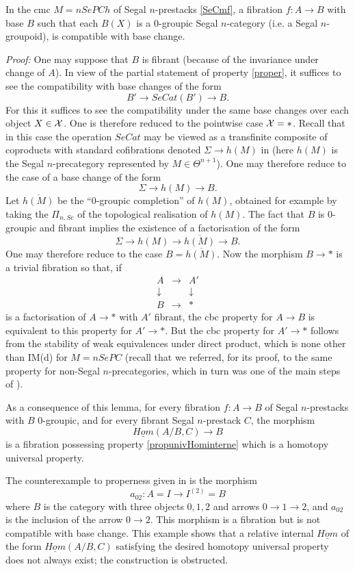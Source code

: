 \begin{lemma}
\label{cestccb}
In the cmc $M=nSePCh$ of Segal $n$-prestacks \ref{SeCmf}, a
fibration
$f:A\rightarrow B$ with base $B$ such that each $B(X)$ is a
$0$-groupic Segal $n$-category (i.e. a Segal $n$-groupoid), is compatible with
base change.
\end{lemma}
{\em Proof:}
One may suppose that $B$ is fibrant (because of the invariance under
change
of $A$).  In view of the partial statement of property \ref{proper},
it suffices
to see the compatibility with base changes of the form
$$
B'\rightarrow SeCat(B')\rightarrow B.
$$
For this it suffices to see the compatibility under the same
base
changes over each object $X\in {\cal X}$. One is therefore reduced to the pointwise
case
${\cal X} =\ast$. Recall that in this case the operation $SeCat$ may be viewed
as a transfinite composite of coproducts with standard cofibrations
denoted $\Sigma \rightarrow h(M)$ in \cite{nCAT} (here $h(M)$ is the
Segal $n$-precategory represented by $M\in \Theta^{n+1}$). One may therefore
reduce
to the case of a base change of the form
$$
\Sigma \rightarrow h(M) \rightarrow B.
$$
Let $\overline{h(M)}$ be the ``$0$-groupic completion'' of $h(M)$,
obtained for
example by taking the $\Pi _{n,Se}$ of the topological realisation
of $h(M)$.
The fact that $B$ is $0$-groupic and fibrant implies the existence of a
factorisation of the form
$$
\Sigma \rightarrow h(M) \rightarrow \overline{h(M)} \rightarrow B.
$$
One may therefore reduce to the case $B= \overline{h(M)}$. Now the
morphism
$B\rightarrow \ast$ is a trivial fibration so that, if
$$
\begin{array}{ccc}
A&\rightarrow &A'\\
\downarrow &&\downarrow \\
B&\rightarrow &\ast
\end{array}
$$
is a factorisation of $A\rightarrow \ast$ with $A'$ fibrant,
the cbc
property for $A\rightarrow B$ is equivalent to this property for
$A'\rightarrow \ast$. But the cbc property for $A'\rightarrow \ast$
follows
from the stability of weak equivalences under direct
product, which is none other than IM(d) for $M=nSePC$ (recall that we referred,
for its proof, to the same property for
non-Segal $n$-precategories, which in turn was one of the
main steps of \cite{nCAT}).
\eop

As a consequence of this lemma, for every fibration $f:A\rightarrow B$
of Segal $n$-prestacks with $B$ $0$-groupic, and for
every
fibrant Segal $n$-prestack $C$, the morphism
$$
\underline{Hom}(A/B,C)\rightarrow B
$$
is a fibration possessing
property \ref{propunivHominterne} which is a homotopy universal property.

The counterexample to properness given in \cite{nCAT} is the
morphism
$$
a_{02}: A=I\rightarrow I^{(2)}=B
$$
where $B$ is the category with three objects $0,1,2$ and arrows
$0\rightarrow 1\rightarrow 2$, and $a_{02}$ is the inclusion of the arrow
$0\rightarrow 2$. This morphism is a fibration but is not compatible with
base change. This example shows that a relative internal
$\underline{Hom}$ of the form $\underline{Hom}(A/B,C)$
satisfying the desired homotopy universal property does not always exist;
the construction is obstructed.
